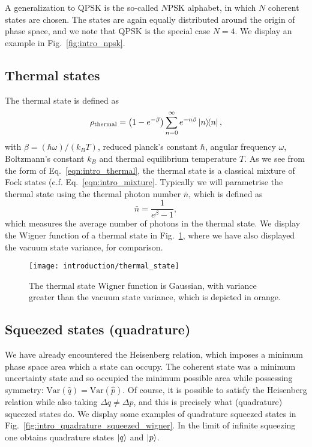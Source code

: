 A generalization to QPSK is the so-called $N$PSK alphabet, in which $N$ coherent states are chosen. The states are again equally distributed around the origin of phase space, and we note that QPSK is the special case $N=4$. We display an example in Fig.~\ref{fig:intro_npsk}.



\FloatBarrier
\subsection{Thermal states}\label{sec:intro_thermal}

The thermal state is defined as
\begin{equation}\label{eqn:intro_thermal}
\rho_{\text{thermal}} = \left( 1 - e^{-\beta} \right) \sum_{n=0}^\infty e^{- n \beta} \dyad{n},
\end{equation}
with $\beta = \left( \hbar \omega \right)/\left(k_B T\right)$, reduced planck's constant $\hbar$, angular frequency $\omega$, Boltzmann's constant $k_B$ and thermal equilibrium temperature $T$. As we see from the form of Eq.~\ref{eqn:intro_thermal}, the thermal state is a classical mixture of Fock states (c.f. Eq.~\ref{eqn:intro_mixture}. Typically we will parametrise the thermal state using the thermal photon number $\bar{n}$, which is defined as 
\begin{equation}
\bar{n} = \frac{1}{e^\beta - 1},
\end{equation}
which measures the average number of photons in the thermal state. We display the Wigner function of a thermal state in Fig.~\ref{fig:thermal_state}, where we have also displayed the vacuum state variance, for comparison.


\begin{figure}[htp]
\captionsetup{width=0.8\linewidth}
\centering
\texttt{[image: introduction/thermal\_state]}
\caption{\label{fig:thermal_state} The thermal state Wigner function is Gaussian, with variance greater than the vacuum state variance, which is depicted in orange.}
\end{figure}

\FloatBarrier
\subsection{Squeezed states (quadrature)}

We have already encountered the Heisenberg relation, which imposes a minimum phase space area which a state can occupy. The coherent state was a minimum uncertainty state and so occupied the minimum possible area while possessing symmetry: $\text{Var}\left( \hat{q}\right) = \text{Var}\left(\hat{p}\right)$. Of course, it is possible to satisfy the Heisenberg relation while also taking $\Delta q \ne \Delta p$, and this is precisely what (quadrature) squeezed states do. We display some examples of quadrature squeezed states in Fig.~\ref{fig:intro_quadrature_squeezed_wigner}. In the limit of infinite squeezing one obtains quadrature states $\ket{q}$ and $\ket{p}$.

